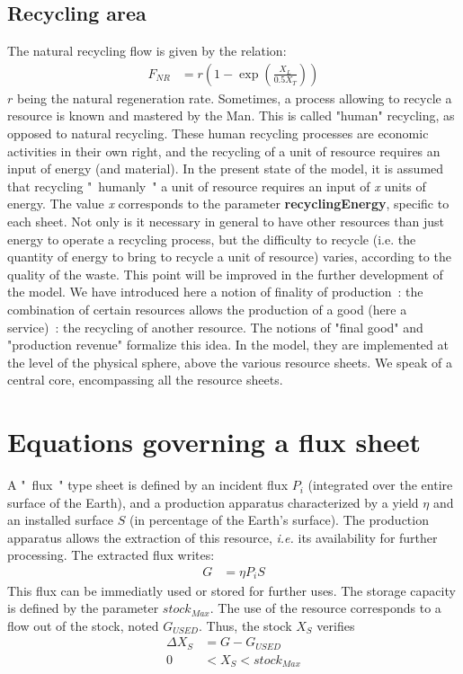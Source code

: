 \documentclass[12pt,a4paper]{article}%
\begin{document}
\begin{appendix}
\subsection{Recycling area}
The natural recycling flow is given by the relation: 
\begin{align}
	F_{NR} &= r\left( 1-\exp\left( \frac{X_{L}}{0.5X_{T}}\right) \right )
\end{align}
$r$ being the natural regeneration rate.  Sometimes, a process allowing to recycle a resource is known and mastered by the Man. This is called "human" recycling, as opposed to natural recycling. These human recycling processes are economic activities in their own right, and the recycling of a unit of resource requires an input of energy (and material). In the present state of the model, it is assumed that recycling "~humanly~" a unit of resource requires an input of \textit{x} units of energy. The value \textit{x} corresponds to the parameter \textbf{recyclingEnergy}, specific to each sheet. Not only is it necessary in general to have other resources than just energy to operate a recycling process, but the difficulty to recycle (i.e. the quantity of energy to bring to recycle a unit of resource) varies, according to the quality of the waste. This point will be improved in the further development of the model. We have introduced here a notion of finality of production~: the combination of certain resources allows the production of a good (here a service)~: the recycling of another resource. The notions of "final good" and "production revenue" formalize this idea. In the model, they are implemented at the level of the physical sphere, above the various resource sheets. We speak of a central core, encompassing all the resource sheets.  

\section{Equations governing a flux sheet}
 A "~flux~" type sheet is defined by an incident flux $P_{i}$ (integrated over the entire surface of the Earth), and a production apparatus characterized by a yield $\eta$ and an installed surface $S$ (in percentage of the Earth's surface). The production apparatus allows the extraction of this resource, \textit{ i.e.} its availability for further processing.  The extracted flux writes:
 \begin{align}
 	G &=\eta P_i S
 \end{align}
 This flux can be immediatly used or stored for further uses. The storage capacity is defined by the parameter $stock_{Max}$.  The use of the resource corresponds to a flow out of the stock, noted $G_{USED}$.  Thus, the stock $X_{S}$ verifies 
 \begin{align}
	 \Delta X_{S} 		& = G - G_{USED} \\
	   				0 & <X_{S}<stock_{Max}	
 \end{align}   


\end{appendix}
\end{document}

